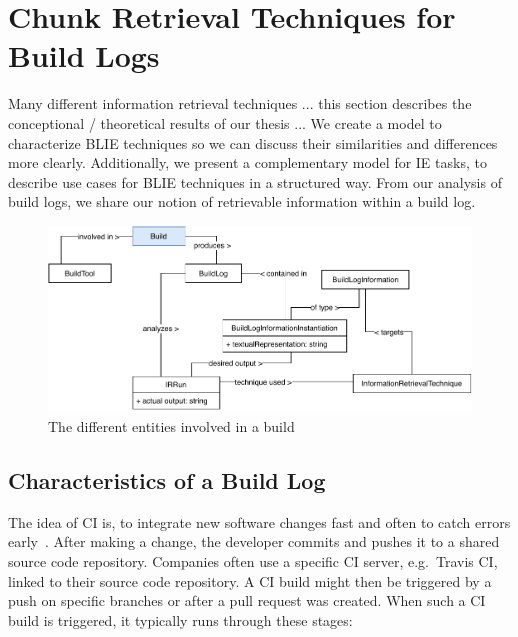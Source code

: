\documentclass[\myrootdir/main.tex]{subfiles}
\begin{document}
\chapter{Chunk Retrieval Techniques for Build Logs}
\label{sec:ir-techniques}
Many different information retrieval techniques ... this section describes the conceptional / theoretical results of our thesis ...
We create a model to characterize BLIE techniques so we can discuss their similarities and differences more clearly.
Additionally, we present a complementary model for IE tasks, to describe use cases for BLIE techniques in a structured way.
From our analysis of build logs, we share our notion of retrievable information within a build log.

\begin{figure}[htbp]
	\centering
	\includegraphics[width=\textwidth, clip]{img/build-overview.pdf}
	\caption{The different entities involved in a build}
	\label{fig:build-overview}
\end{figure}

\section{Characteristics of a Build Log}
\label{sec:bl-characteristics}
The idea of CI is, to integrate new software changes fast and often to catch errors early~\cite{humble2010continuous}.
After making a change, the developer commits and pushes it to a shared source code repository.
Companies often use a specific CI server, e.g.\ Travis CI, linked to their source code repository.
A CI build might then be triggered by a push on specific branches or after a pull request was created.
When such a CI build is triggered, it typically runs through these stages:
\end{document}
